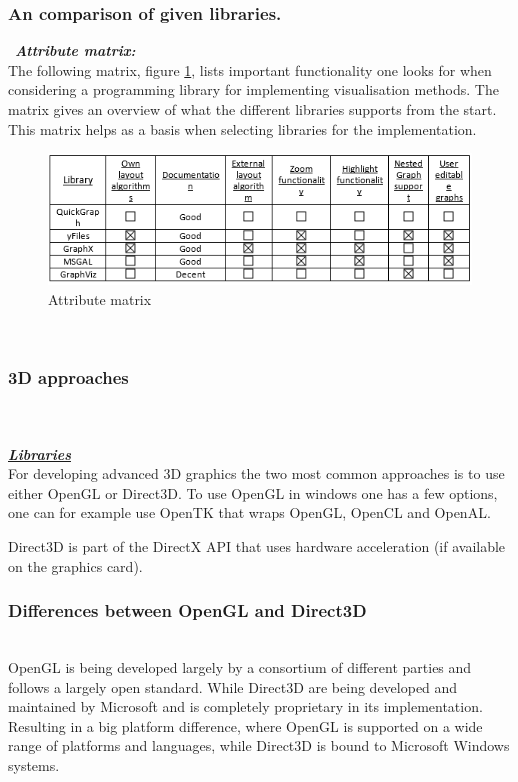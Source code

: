 \documentclass[a4paper,11pt]{kth-mag}
\begin{document}
\begin{appendices}
\subsubsection{An comparison of given libraries.}
\
\textbf{\textit{Attribute matrix:}}\
\newline
\\
The following matrix, figure \ref{fig:libAttributeMatrix:appendix}, lists important functionality one looks for when considering a programming library for implementing visualisation methods. The matrix gives an overview of what the 
different libraries supports from the start. This matrix helps as a basis when selecting libraries for the implementation.\\

\begin{figure}[!htbp]
	\centering
	\includegraphics[scale=1.0]{LibraryAttributeMatrix}
	\caption{Attribute matrix}
	\label{fig:libAttributeMatrix:appendix}
\end{figure}
\\
\subsubsection{3D approaches}\\
\\
\newline
\textbf{\textit{\underline{Libraries}}}\\
\newline
For developing advanced 3D graphics the two most common approaches is to use either OpenGL\cite{website:OpenGL} or Direct3D\cite{website:Direct3D}. To use OpenGL in windows one has a few options, one can for example use
 OpenTK that wraps OpenGL, OpenCL\cite{website:OpenCL} and OpenAL\cite{website:OpenAL}. 

Direct3D is part of the DirectX API that uses hardware acceleration (if available on the graphics card).
\\
\subsubsection{Differences between OpenGL and Direct3D}\\
\newline
OpenGL is being developed largely by a consortium of different parties and follows a largely open standard. While Direct3D are being developed 
and maintained by Microsoft and is completely proprietary in its implementation. Resulting in a big platform difference, where OpenGL is supported on a wide range of platforms and languages,
while Direct3D is bound to Microsoft Windows systems. 


\end{appendices}
\end{document}

